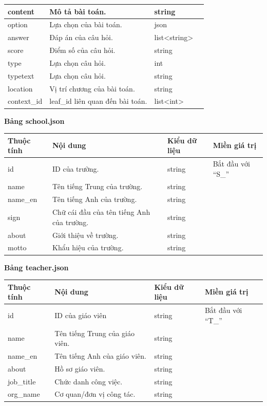 \newpage
\begin{center}
\begin{tabular}{|| m{5em}  m{10em}  m{8em}  m{8em}||} 
 \hline
 content & Mô tả bài toán. & string &  \\ 
 \hline
 option & Lựa chọn của bài toán. & json & \\
 \hline
 answer & Đáp án của câu hỏi. & list<string> & \\
 \hline
 score & Điểm số của câu hỏi. & string & \\
 \hline
 type & Lựa chọn câu hỏi. & int & \\
 \hline
 typetext & Lựa chọn câu hỏi. & string & \\
 \hline
 location & Vị trí chương của bài toán. & string & \\
 \hline
 context\_id & leaf\_id liên quan đến bài toán. & list<int> &  \\ [1ex] 
 \hline
\end{tabular}
\end{center}
\textbf{Bảng school.json}
\begin{center}
\begin{tabular}{|| m{5em}  m{10em}  m{6em}  m{11em}||} 
 \hline
 Thuộc tính & Nội dung & Kiểu dữ liệu & Miền giá trị \\ [0.5ex] 
 \hline\hline
 id & ID của trường. & string & Bắt đầu với “S\_”\\
 \hline
 name & Tên tiếng Trung của trường. & string &  \\ \hline
 name\_en & Tên tiếng Anh của trường. & string &  \\ 
 \hline
  sign & Chữ cái đầu của tên tiếng Anh của trường. & string & \\ \hline
 about & Giới thiệu về trường. & string & \\ 
 \hline
 motto & Khẩu hiệu của trường. & string &  \\ [1ex] 
 \hline
\end{tabular}
\end{center}
\newpage
\textbf{Bảng teacher.json}
\begin{center}
\begin{tabular}{|| m{5em}  m{10em}  m{6em}  m{11em}||} 
 \hline
 Thuộc tính & Nội dung & Kiểu dữ liệu & Miền giá trị \\ [0.5ex] 
 \hline\hline
 id & ID của giáo viên & string & Bắt đầu với “T\_”\\
 \hline
 name & Tên tiếng Trung của giáo viên. & string &  \\ \hline
 name\_en & Tên tiếng Anh của giáo viên. & string &  \\ 
 \hline
  about & Hồ sơ giáo viên. & string & \\ \hline
 job\_title & Chức danh công việc. & string & \\ 
 \hline
 org\_name & Cơ quan/đơn vị công tác. & string &  \\ [1ex] 
 \hline
\end{tabular}
\end{center}
